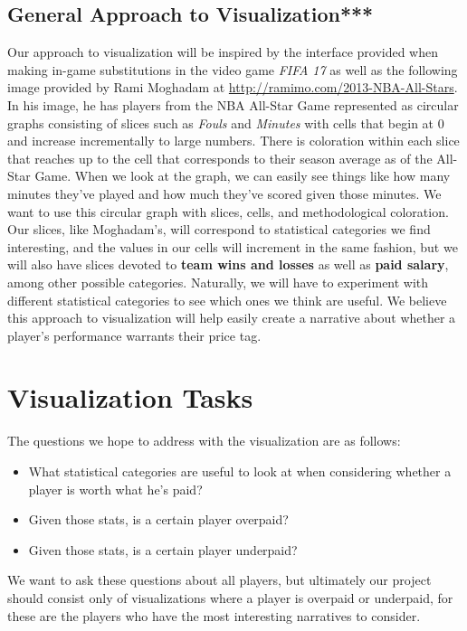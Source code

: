 \documentclass[journal]{vgtc}                %
\begin{document}
\subsection{General Approach to Visualization***}
Our approach to visualization will be inspired by the interface provided when making in-game substitutions in the video game \emph{FIFA 17} as well as the following image provided by Rami Moghadam at \url{http://ramimo.com/2013-NBA-All-Stars}. In his image, he has players from the NBA All-Star Game represented as circular graphs consisting of slices such as \emph{Fouls} and \emph{Minutes} with cells that begin at 0 and increase incrementally to large numbers. There is coloration within each slice that reaches up to the cell that corresponds to their season average as of the All-Star Game. When we look at the graph, we can easily see things like how many minutes they've played and how much they've scored given those minutes. We want to use this circular graph with slices, cells, and methodological coloration. Our slices, like Moghadam's, will correspond to statistical categories we find interesting, and the values in our cells will increment in the same fashion, but we will also have slices devoted to \textbf{team wins and losses} as well as \textbf{paid salary}, among other possible categories. Naturally, we will have to experiment with different statistical categories to see which ones we think are useful. We believe this approach to visualization will help easily create a narrative about whether a player's performance warrants their price tag.

\section{Visualization Tasks}
The questions we hope to address with the visualization are as follows:
\begin{itemize}
\item What statistical categories are useful to look at when considering whether a player is worth what he's paid?
\item Given those stats, is a certain player overpaid?
\item Given those stats, is a certain player underpaid?
\end{itemize}

We want to ask these questions about all players, but ultimately our project should consist only of visualizations where a player is overpaid or underpaid, for these are the players who have the most interesting narratives to consider.
\end{document}

